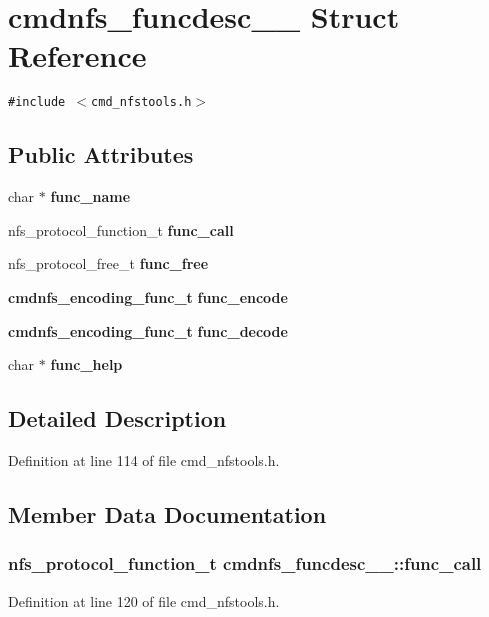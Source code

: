 \section{cmdnfs\_\-funcdesc\_\-\_\- Struct Reference}
\label{structcmdnfs__funcdesc____}
{\tt \#include $<$cmd\_\-nfstools.h$>$}

\subsection*{Public Attributes}
\begin{CompactItemize}
\item 
char $\ast$ {\bf func\_\-name}
\item 
nfs\_\-protocol\_\-function\_\-t {\bf func\_\-call}
\item 
nfs\_\-protocol\_\-free\_\-t {\bf func\_\-free}
\item 
{\bf cmdnfs\_\-encoding\_\-func\_\-t} {\bf func\_\-encode}
\item 
{\bf cmdnfs\_\-encoding\_\-func\_\-t} {\bf func\_\-decode}
\item 
char $\ast$ {\bf func\_\-help}
\end{CompactItemize}


\subsection{Detailed Description}


Definition at line 114 of file cmd\_\-nfstools.h.

\subsection{Member Data Documentation}
\subsubsection[{func\_\-call}]{\setlength{\rightskip}{0pt plus 5cm}nfs\_\-protocol\_\-function\_\-t {\bf cmdnfs\_\-funcdesc\_\-\_\-::func\_\-call}}\label{structcmdnfs__funcdesc_____ebe59d3c24f14b1aba9af94451d1f571}




Definition at line 120 of file cmd\_\-nfstools.h.
